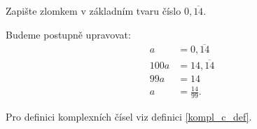 \begin{priklad}
    Zapište zlomkem v základním tvaru číslo $0{,}\overline{14}.$
\end{priklad}

\begin{reseni}
    Budeme postupně upravovat:
    \begin{align*}
        a&=0{,}\overline{14}\\
        100a &= 14{,}\overline{14} \\
        99a &= 14\\
        a &= \frac{14}{99}.
    \end{align*}
\end{reseni}


\begin{pozn}
    Pro definici komplexních čísel viz definici \ref{kompl_c_def}.
\end{pozn}

